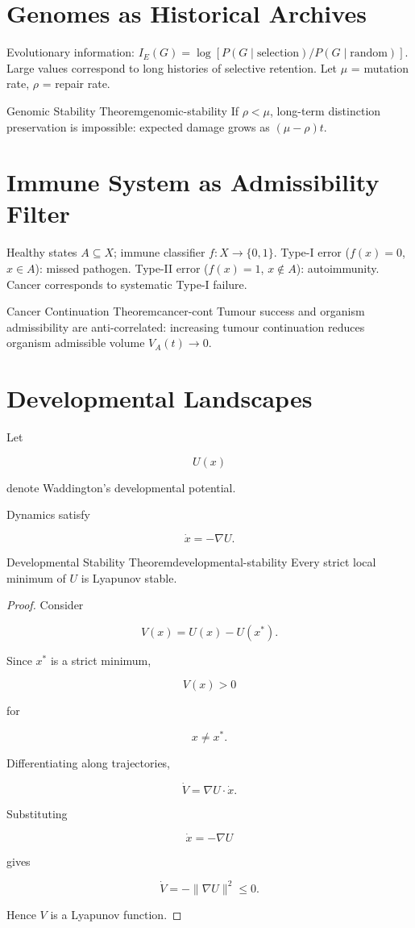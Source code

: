 \documentclass[12pt,twoside,openright]{book}
\begin{document}
\section{Genomes as Historical Archives}

Evolutionary information:
$I_E(G) = \log[P(G \mid \text{selection})/P(G \mid \text{random})]$.
Large values correspond to long histories of selective
retention. Let $\mu$ = mutation rate, $\rho$ = repair rate.

\begin{theorem}{Genomic Stability Theorem}{genomic-stability}
  If $\rho < \mu$, long-term distinction preservation
  is impossible: expected damage grows as $(\mu-\rho)t$.
\end{theorem}

\section{Immune System as Admissibility Filter}

Healthy states $A \subseteq X$; immune classifier
$f: X \to \{0,1\}$.
Type-I error ($f(x)=0$, $x \in A$): missed pathogen.
Type-II error ($f(x)=1$, $x \notin A$): autoimmunity.
Cancer corresponds to systematic Type-I failure.

\begin{theorem}{Cancer Continuation Theorem}{cancer-cont}
  Tumour success and organism admissibility are
  anti-correlated: increasing tumour continuation reduces
  organism admissible volume $V_A(t) \to 0$.
\end{theorem}
\section{Developmental Landscapes}

Let

\[
U(x)
\]

denote Waddington's developmental potential.

Dynamics satisfy

\[
\dot x
=
-\nabla U.
\]

\begin{theorem}{Developmental Stability Theorem}{developmental-stability}
Every strict local minimum of \(U\) is Lyapunov stable.
\end{theorem}

\begin{proof}
Consider

\[
V(x)
=
U(x)-U(x^*).
\]

Since \(x^*\) is a strict minimum,

\[
V(x)>0
\]

for

\[
x\neq x^*.
\]

Differentiating along trajectories,

\[
\dot V
=
\nabla U\cdot \dot x.
\]

Substituting

\[
\dot x=-\nabla U
\]

gives

\[
\dot V
=
-\|\nabla U\|^2
\le0.
\]

Hence \(V\) is a Lyapunov function.
\end{proof}
\end{document}
